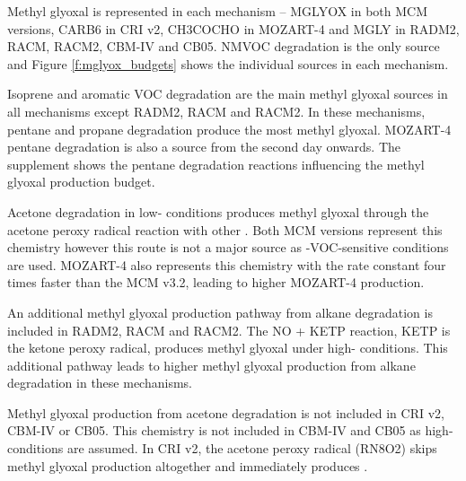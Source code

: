 Methyl glyoxal is represented in each mechanism -- MGLYOX in both MCM versions, CARB6 in CRI v2, CH3COCHO in MOZART-4 and MGLY in RADM2, RACM, RACM2, CBM-IV and CB05.
NMVOC degradation is the only source and Figure \ref{f:mglyox_budgets} shows the individual sources in each mechanism.

Isoprene and aromatic VOC degradation are the main methyl glyoxal sources in all mechanisms except RADM2, RACM and RACM2.
In these mechanisms, pentane and propane degradation produce the most methyl glyoxal.
MOZART-4 pentane degradation is also a source from the second day onwards.
The supplement shows the pentane degradation reactions influencing the methyl glyoxal production budget.

Acetone degradation in low- conditions produces methyl glyoxal through the acetone peroxy radical reaction with other  \citep{Fu:2008}.
Both MCM versions represent this chemistry however this route is not a major source as -VOC-sensitive conditions are used.  
MOZART-4 also represents this chemistry with the rate constant four times faster than the MCM v3.2, leading to higher MOZART-4 production.

An additional methyl glyoxal production pathway from alkane degradation is included in RADM2, RACM and RACM2.
The NO + KETP reaction, KETP is the ketone peroxy radical, produces methyl glyoxal under high- conditions.
This additional pathway leads to higher methyl glyoxal production from alkane degradation in these mechanisms.

Methyl glyoxal production from acetone degradation is not included in CRI v2, CBM-IV or CB05.
This chemistry is not included in CBM-IV and CB05 as high- conditions are assumed.
In CRI v2, the acetone peroxy radical (RN8O2) skips methyl glyoxal production altogether and immediately produces .
